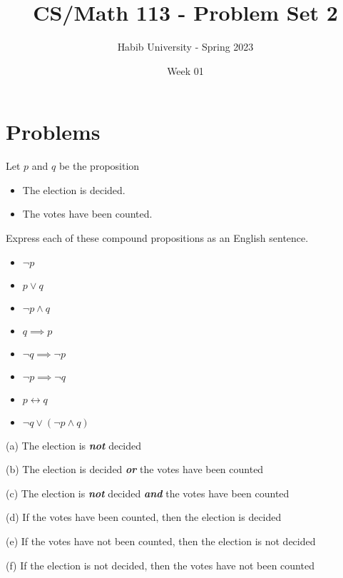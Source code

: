 \documentclass[addpoints]{exam}
\title{CS/Math 113 - Problem Set 2}
\author{Habib University - Spring 2023}
\date{Week 01}
\newenvironment{problem}[2][Problem]{\begin{trivlist}
    \item[\hskip \labelsep {\bfseries #1}\hskip \labelsep {\bfseries #2.}]}{\end{trivlist}}
\begin{document}
\maketitle
\section{Problems}
\begin{sloppypar}
\begin{problem}{1}
Let $p$ and $q$ be the proposition
\begin{itemize}
    \item[$p:$] The election is decided.
    \item[$q:$] The votes have been counted.
\end{itemize}
Express each of these compound propositions as an English sentence.

\begin{itemize}
    \item[(a)] $\neg p$
    \item[(b)] $p \lor q$
    \item[(c)] $\neg p \land q $
    \item[(d)] $q \implies p $
    \item[(e)] $ \neg q \implies \neg p $
    \item[(f)] $\neg p \implies \neg q$
    \item[(g)] $p \leftrightarrow q$
    \item[(h)] $\neg q \lor (\neg p \land q) $
\end{itemize}
\end{problem}

\begin{questions}
    \question
    \begin{solution}
        
        (a) The election is \textbf{\textit{not}} decided

        (b) The election is decided \textbf{\textit{or}} the votes have been counted

        (c) The election is \textbf{\textit{not}} decided \textbf{\textit{and}} the votes have been counted

        (d) If the votes have been counted, then the election is decided

        (e) If the votes have not been counted, then the election is not decided 

        (f) If the election is not decided, then the votes have not been counted 


\end{solution}
\end{questions}
\end{sloppypar}
\end{document}
